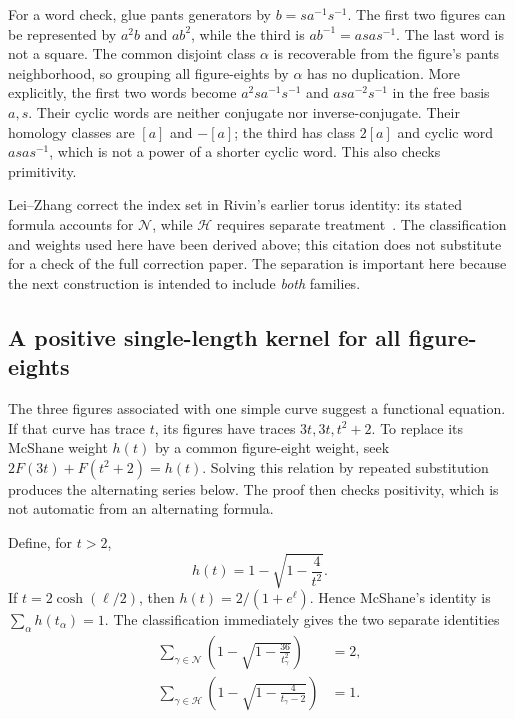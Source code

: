 For a word check, glue pants generators by $b=s a^{-1}s^{-1}$. The first
two figures can be represented by $a^2b$ and $ab^2$, while the third is
$ab^{-1}=asa s^{-1}$. The last word is not a square. The common disjoint
class $\alpha$ is recoverable from the figure's pants neighborhood, so
grouping all figure-eights by $\alpha$ has no duplication.
More explicitly, the first two words become $a^2sa^{-1}s^{-1}$ and
$asa^{-2}s^{-1}$ in the free basis $a,s$. Their cyclic words are neither
conjugate nor inverse-conjugate. Their homology classes are $[a]$ and
$-[a]$; the third has class $2[a]$ and cyclic word $asa s^{-1}$, which
is not a power of a shorter cyclic word. This also checks primitivity.

Lei--Zhang correct the index set in Rivin's earlier torus identity: its
stated formula accounts for $\mathcal N$, while $\mathcal H$ requires
separate treatment~\cite[p.~2350049-1, abstract]{LeiZhang}. The
classification and weights used here have been derived above; this
citation does not substitute for a check of the full correction paper.
The separation is important here
because the next construction is intended to include \emph{both} families.

\subsection{A positive single-length kernel for all figure-eights}

The three figures associated with one simple curve suggest a
functional equation. If that curve has trace $t$, its figures
have traces $3t,3t,t^2+2$. To replace its McShane weight $h(t)$
by a common figure-eight weight, seek
$2F(3t)+F(t^2+2)=h(t)$. Solving this relation by repeated
substitution produces the alternating series below. The proof
then checks positivity, which is not automatic from an alternating
formula.

Define, for $t>2$,
\begin{equation}
 h(t)=1-\sqrt{1-\frac4{t^2}}.
 \label{eq:htrace}
\end{equation}
If $t=2\cosh(\ell/2)$, then $h(t)=2/(1+e^\ell)$. Hence McShane's
identity is $\sum_\alpha h(t_\alpha)=1$. The classification immediately
gives the two separate identities
\begin{align}
 \sum_{\gamma\in\mathcal N}
       \left(1-\sqrt{1-\frac{36}{t_\gamma^2}}\right)&=2,
       \label{eq:nidentity}\\
 \sum_{\gamma\in\mathcal H}
       \left(1-\sqrt{1-\frac4{t_\gamma-2}}\right)&=1.
       \label{eq:hidentity}
\end{align}

